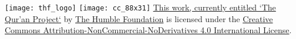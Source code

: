 \texttt{[image: thf\_logo]}
\texttt{[image: cc\_88x31]}
\href{http://github.com/humblefoundation/quran-project}{This work, currently entitled `The Qur'an Project`} by \href{http://www.humblefoundation.org}{The Humble Foundation} is licensed under the \href{http://creativecommons.org/licenses/by-nc-nd/4.0/}{Creative Commons Attribution-NonCommercial-NoDerivatives 4.0 International License}.